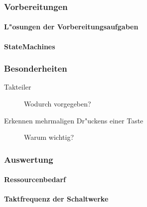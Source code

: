 \documentclass [] {scrartcl}
\begin{document}
  \subsubsection{Vorbereitungen}
  \paragraph{L"osungen der Vorbereitungsaufgaben}
  \paragraph{StateMachines}
  \subsubsection{Besonderheiten}
  \begin{description}
    \item[Takteiler] Wodurch vorgegeben?
    \item[Erkennen mehrmaligen Dr"uckens einer Taste] Warum wichtig?
  \end{description}
  \subsubsection{Auswertung}
  \paragraph{Ressourcenbedarf}
    
  \paragraph{Taktfrequenz der Schaltwerke}
    
\end{document}
